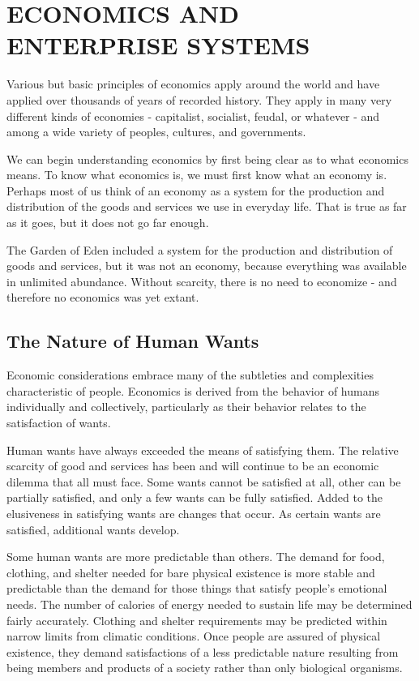 \chapter{ECONOMICS AND ENTERPRISE SYSTEMS}\label{chap:4}

Various but basic principles of economics apply around the world and have applied over thousands of years of recorded history. They apply in many very different kinds of economies - capitalist, socialist, feudal, or whatever - and among a wide variety of peoples, cultures, and governments. 

We can begin understanding economics by first being clear as to what economics means. To know what economics is, we must first know what an economy is. Perhaps most of us think of an economy as a system for the production and distribution of the goods and services we use in everyday life. That is true as far as it goes, but it does not go far enough.

The Garden of Eden included a system for the production and distribution of goods and services, but it was not an economy, because everything was available in unlimited abundance. Without scarcity, there is no need to economize - and therefore no economics was yet extant.

\section{The Nature of Human Wants}

Economic considerations embrace many of the subtleties and complexities characteristic of people. Economics is derived from the behavior of humans individually and collectively, particularly as their behavior relates to the satisfaction of wants.

Human wants have always exceeded the means of satisfying them. The relative scarcity of good and services has been and will continue to be an economic dilemma that all must face. Some wants cannot be satisfied at all, other can be partially satisfied, and only a few wants can be fully satisfied. Added to the elusiveness in satisfying wants are changes that occur.  As certain wants are satisfied, additional wants develop.

Some human wants are more predictable than others. The demand for food, clothing, and shelter needed for bare physical existence is more stable and predictable than the demand for those things that satisfy people’s emotional needs. The number of calories of energy needed to sustain life may be determined fairly accurately. Clothing and shelter requirements may be predicted within narrow limits from climatic conditions. Once people are assured of physical existence, they demand satisfactions of a less predictable nature resulting from being members and products of a society rather than only biological organisms.

